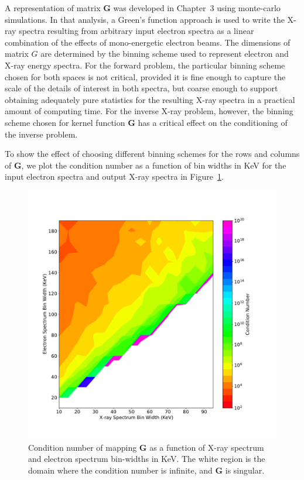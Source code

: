 A representation of matrix $\mathbf{G}$ was developed in Chapter~3 using monte-carlo simulations. In that analysis, a Green's function approach is used to write the X-ray spectra resulting from arbitrary input electron spectra as a linear combination of the effects of mono-energetic electron beams. The dimensions of matrix $G$ are determined by the binning scheme used to represent electron and X-ray energy spectra. For the forward problem, the particular binning scheme chosen for both spaces is not critical, provided it is fine enough to capture the scale of the details of interest in both spectra, but coarse enough to support obtaining adequately pure statistics for the resulting X-ray spectra in a practical amount of computing time. For the inverse X-ray problem, however, the binning scheme chosen for kernel function $\mathbf{G}$ has a critical effect on the conditioning of the inverse problem.

To show the effect of choosing different binning schemes for the rows and columns of $\mathbf{G}$, we plot the condition number as a function of bin widths in KeV for the input electron spectra and output X-ray spectra in Figure~\ref{condition_number_binning}. 

\begin{figure}[p]
\label{condition_number_binning}
\centering
\includegraphics[width=1.0\textwidth]{figures/chapter_4/condition_number_binning/fig.pdf}
\caption{Condition number of mapping $\mathbf{G}$ as a function of X-ray spectrum and electron spectrum bin-widths in KeV. The white region is the domain where the condition number is infinite, and $\mathbf{G}$ is singular.}
\end{figure}

